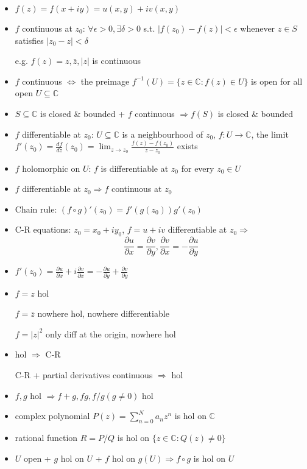 \documentclass[10pt,a4paper]{article}
\begin{document}
\begin{multicols}{2}
\begin{itemize}
    \item $f(z)=f(x+iy)=u(x,y)+iv(x,y)$
    \item $f$ continuous at $z_0$: $\forall \epsilon >0, \exists \delta >0$ s.t. $|f(z_0)-f(z)|<\epsilon$ whenever $z\in S$ satisfies $|z_0-z|<\delta$
      
      e.g.  $f(z)=z,\bar z, |z|$ is continuous
      
    \item $f$ continuous $\Leftrightarrow$ the preimage $f^{-1}(U) = \{ z \in \mathbb C : f(z) \in U \}$ is open for all open $U \subseteq \mathbb C$
    \item $S \subseteq \mathbb C$ is closed \& bounded + $f$ continuous $\Rightarrow f(S)$ is closed \& bounded
    
    
    \item $f$ differentiable at $z_0$: $U \subseteq \mathbb C$ is a neighbourhood of $z_0$, $f: U \rightarrow \mathbb C$, the limit $\displaystyle f'(z_0)=\frac{df}{dz}(z_0)=\lim_{z\rightarrow z_0} \frac{f(z)-f(z_0)}{z-z_0}$ exists
    \item $f$ holomorphic on $U$: $f$ is differentiable at $z_0$ for every $z_0 \in U$
    \item $f$ differentiable at $z_0 \Rightarrow f$ continuous at $z_0$
    \item Chain rule: $(f \circ g)'(z_0)=f'(g(z_0))g'(z_0)$
    \item C-R equations: $z_0=x_0+iy_0$, $f=u+iv$ differentiable at $z_0 \Rightarrow$
      $$\frac{\partial u}{\partial x} = \frac{\partial v}{\partial y}, \frac{\partial v}{\partial x} = -\frac{\partial u}{\partial y}$$
    
    \item $f'(z_0) = \frac{\partial u}{\partial x} + i\frac{\partial v}{\partial x} = -\frac{\partial u}{\partial y} + \frac{\partial v}{\partial y}$
    
    \item $f=z$ hol
    
      $f=\bar z$ nowhere hol, nowhere differentiable
      
      $f=|z|^2$ only diff at the origin, nowhere hol
    
    \item hol $\Rightarrow$ C-R
      
      C-R + partial derivatives continuous $\Rightarrow$ hol
    \item $f,g$ hol $\Rightarrow f+g, fg, f/g (g \neq 0)$ hol 
    \item complex polynomial $P(z)=\sum_{n=0}^N a_n z^n$ is hol on $\mathbb C$
    \item rational function $R=P/Q$ is hol on $\{ z \in \mathbb C: Q(z) \neq 0 \}$ 
    \item $U$ open + $g$ hol on $U$ + $f$ hol on $g(U) \Rightarrow f \circ g$ is hol on $U$
    

\end{itemize}
\end{multicols}
\end{document}
